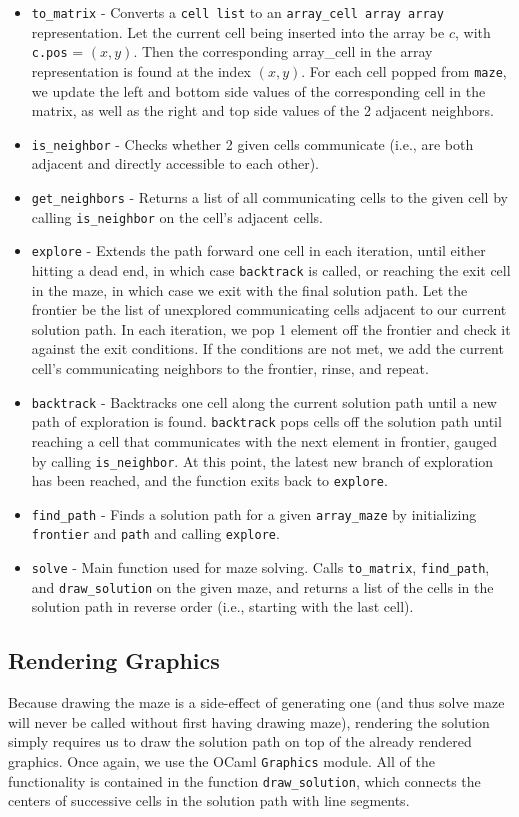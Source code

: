 \documentclass[11pt, margin=1in]{article}
\begin{document}
\begin{itemize}
\item \texttt{to\_matrix} - Converts a \texttt{cell list} to an \texttt{array\_cell array array} representation. Let the current cell being inserted into the array be $c$, with \texttt{c.pos} = $(x, y)$. Then the corresponding array\_cell in the array representation is found at the index $(x, y)$. For each cell popped from \texttt{maze}, we update the left and bottom side values of the corresponding cell in the matrix, as well as the right and top side values of the 2 adjacent neighbors.
\item \texttt{is\_neighbor} - Checks whether 2 given cells communicate (i.e., are both adjacent and directly accessible to each other).
\item \texttt{get\_neighbors} - Returns a list of all communicating cells to the given cell by calling \texttt{is\_neighbor} on the cell's adjacent cells.
\item \texttt{explore} - Extends the path forward one cell in each iteration, until either hitting a dead end, in which case \texttt{backtrack} is called, or reaching the exit cell in the maze, in which case we exit with the final solution path. Let the frontier be the list of unexplored communicating cells adjacent to our current solution path. In each iteration, we pop 1 element off the frontier and check it against the exit conditions. If the conditions are not met, we add the current cell's communicating neighbors to the frontier, rinse, and repeat.
\item \texttt{backtrack} - Backtracks one cell along the current solution path until a new path of exploration is found.   \texttt{backtrack} pops cells off the solution path until reaching a cell that communicates with the next element in frontier, gauged by calling \texttt{is\_neighbor}. At this point, the latest new branch of exploration has been reached, and the function exits back to \texttt{explore}. 
\item \texttt{find\_path} - Finds a solution path for a given \texttt{array\_maze} by initializing \texttt{frontier} and \texttt{path} and calling \texttt{explore}.
\item \texttt{solve} - Main function used for maze solving. Calls \texttt{to\_matrix}, \texttt{find\_path}, and \texttt{draw\_solution} on the given maze, and returns a list of the cells in the solution path in reverse order (i.e., starting with the last cell).
\end{itemize}

\subsection{Rendering Graphics} %
Because drawing the maze is a side-effect of generating one (and thus solve maze will never be called without first having drawing maze), rendering the solution simply requires us to draw the solution path on top of the already rendered graphics. Once again, we use the OCaml \texttt{Graphics} module. All of the functionality is contained in the function \texttt{draw\_solution}, which connects the centers of successive cells in the solution path with line segments.
\end{document}
